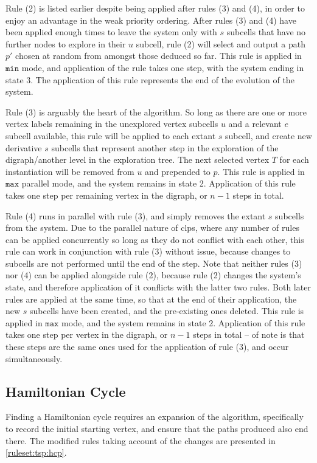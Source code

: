 Rule (2) is listed earlier despite being applied after rules (3) and (4), in order to enjoy an advantage in the weak priority ordering.  After rules (3) and (4) have been applied enough times to leave the system only with \(s\) subcells that have no further nodes to explore in their \(u\) subcell, rule (2) will select and output a path \(p'\) chosen at random from amongst those deduced so far.  This rule is applied in \(\mathtt{min}\) mode, and application of the rule takes one step, with the system ending in state 3.  The application of this rule represents the end of the evolution of the system.

Rule (3) is arguably the heart of the algorithm.  So long as there are one or more vertex labels remaining in the unexplored vertex subcells \(u\) and a relevant \(e\) subcell available, this rule will be applied to each extant \(s\) subcell, and create new derivative \(s\) subcells that represent another step in the exploration of the digraph/another level in the exploration tree.  The next selected vertex \(T\) for each instantiation will be removed from \(u\) and prepended to \(p\).  This rule is applied in \(\mathtt{max}\) parallel mode, and the system remains in state 2.  Application of this rule takes one step per remaining vertex in the digraph, or \(n - 1\) steps in total.

Rule (4) runs in parallel with rule (3), and simply removes the extant \(s\) subcells from the system.  Due to the parallel nature of \gls{clps}, where any number of rules can be applied concurrently so long as they do not conflict with each other, this rule can work in conjunction with rule (3) without issue, because changes to subcells are not performed until the end of the step.  Note that neither rules (3) nor (4) can be applied alongside rule (2), because rule (2) changes the system's state, and therefore application of it conflicts with the latter two rules.  Both later rules are applied at the same time, so that at the end of their application, the new \(s\) subcells have been created, and the pre-existing ones deleted.  This rule is applied in \(\mathtt{max}\) mode, and the system remains in state 2.  Application of this rule takes one step per vertex in the digraph, or \(n - 1\) steps in total -- of note is that these steps are the same ones used for the application of rule (3), and occur simultaneously.

\subsection{Hamiltonian Cycle}
Finding a Hamiltonian cycle requires an expansion of the algorithm, specifically to record the initial starting vertex, and ensure that the paths produced also end there.  The modified rules taking account of the changes are presented in \autoref{ruleset:tsp:hcp}.

